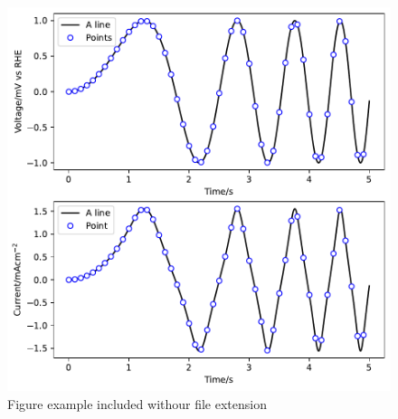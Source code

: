     \begin{figure}[htbp]
        \includegraphics[width=\textwidth]{./figs/example_1.pdf}
        \caption{Figure example included withour file extension}
        \label{figures:fig:example:1}
    \end{figure}



